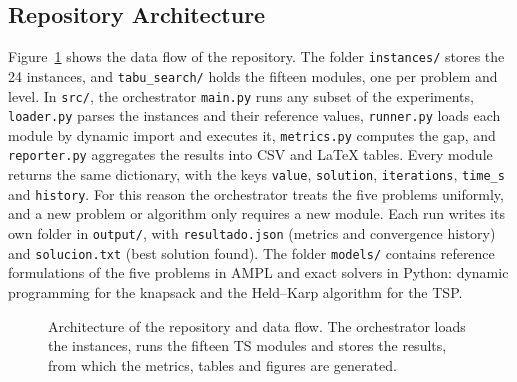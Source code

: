 \documentclass[engproc,proceedingpaper,submit,moreauthors]{Definitions/mdpi}
\begin{document}
\subsection{Repository Architecture}

Figure~\ref{fig:architecture} shows the data flow of the repository. The folder \texttt{instances/} stores the 24 instances, and \texttt{tabu\_search/} holds the fifteen modules, one per problem and level. In \texttt{src/}, the orchestrator \texttt{main.py} runs any subset of the experiments, \texttt{loader.py} parses the instances and their reference values, \texttt{runner.py} loads each module by dynamic import and executes it, \texttt{metrics.py} computes the gap, and \texttt{reporter.py} aggregates the results into CSV and \LaTeX{} tables. Every module returns the same dictionary, with the keys \texttt{value}, \texttt{solution}, \texttt{iterations}, \texttt{time\_s} and \texttt{history}. For this reason the orchestrator treats the five problems uniformly, and a new problem or algorithm only requires a new module. Each run writes its own folder in \texttt{output/}, with \texttt{resultado.json} (metrics and convergence history) and \texttt{solucion.txt} (best solution found). The folder \texttt{models/} contains reference formulations of the five problems in AMPL and exact solvers in Python: dynamic programming for the knapsack and the Held--Karp algorithm \cite{held1962dynamic} for the TSP.

\begin{figure}[H]
\centering
{}
\caption{Architecture of the repository and data flow. The orchestrator loads the instances, runs the fifteen TS modules and stores the results, from which the metrics, tables and figures are generated.\label{fig:architecture}}
\end{figure}
\end{document}
